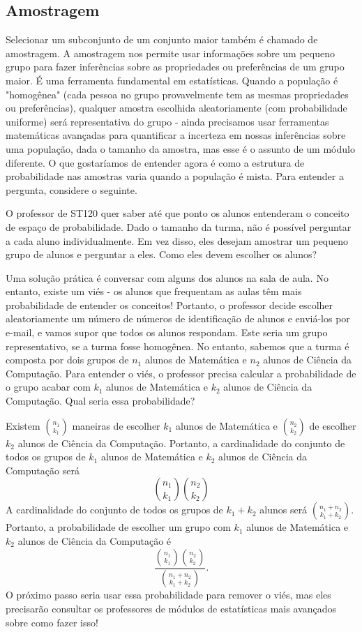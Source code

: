 \subsection{Amostragem}

Selecionar um subconjunto de um conjunto maior também é chamado de amostragem. A amostragem nos permite usar informações sobre um pequeno grupo para fazer inferências sobre as propriedades ou preferências de um grupo maior. É uma ferramenta fundamental em estatísticas. Quando a população é "homogênea" (cada pessoa no grupo provavelmente tem as mesmas propriedades ou preferências), qualquer amostra escolhida aleatoriamente (com probabilidade uniforme) será representativa do grupo - ainda precisamos usar ferramentas matemáticas avançadas para quantificar a incerteza em nossas inferências sobre uma população, dada o tamanho da amostra, mas esse é o assunto de um módulo diferente. O que gostaríamos de entender agora é como a estrutura de probabilidade nas amostras varia quando a população é mista. Para entender a pergunta, considere o seguinte.

\begin{example}
\label{amostragem sem reposição}
O professor de ST120 quer saber até que ponto os alunos entenderam o conceito de espaço de probabilidade. Dado o tamanho da turma, não é possível perguntar a cada aluno individualmente. Em vez disso, eles desejam amostrar um pequeno grupo de alunos e perguntar a eles. Como eles devem escolher os alunos?

Uma solução prática é conversar com alguns dos alunos na sala de aula. No entanto, existe um viés - os alunos que frequentam as aulas têm mais probabilidade de entender os conceitos! Portanto, o professor decide escolher aleatoriamente um número de números de identificação de alunos e enviá-los por e-mail, e vamos supor que todos os alunos respondam. Este seria um grupo representativo, se a turma fosse homogênea. No entanto, sabemos que a turma é composta por dois grupos de $n_1$ alunos de Matemática e $n_2$ alunos de Ciência da Computação. Para entender o viés, o professor precisa calcular a probabilidade de o grupo acabar com $k_1$ alunos de Matemática e $k_2$ alunos de Ciência da Computação. Qual seria essa probabilidade?

Existem $\binom{n_1}{k_1}$ maneiras de escolher $k_1$ alunos de Matemática e $\binom{n_2}{k_2}$ de escolher $k_2$ alunos de Ciência da Computação. Portanto, a cardinalidade do conjunto de todos os grupos de $k_1$ alunos de Matemática e $k_2$ alunos de Ciência da Computação será 
\[
\binom{n_1}{k_1}\binom{n_2}{k_2}
\]
A cardinalidade do conjunto de todos os grupos de $k_1+k_2$ alunos será $\binom{n_1+n_2}{k_1+k_2}$. Portanto, a probabilidade de escolher um grupo com $k_1$ alunos de Matemática e $k_2$ alunos de Ciência da Computação é
\begin{equation}
\frac{\binom{n_1}{k_1}\binom{n_2}{k_2}}{\binom{n_1+n_2}{k_1+k_2}}. %
\end{equation}
O próximo passo seria usar essa probabilidade para remover o viés, mas eles precisarão consultar os professores de módulos de estatísticas mais avançados sobre como fazer isso!
\end{example}

